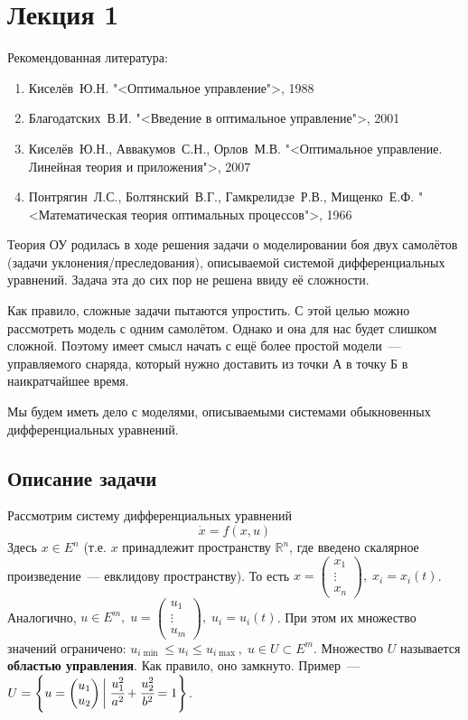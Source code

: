 \section{Лекция 1}

Рекомендованная литература:
\begin{enumerate}
    \item Киселёв~Ю.Н. "<Оптимальное управление">, 1988
    \item Благодатских~В.И. "<Введение в оптимальное управление">, 2001
    \item Киселёв~Ю.Н., Аввакумов~С.Н., Орлов~М.В. "<Оптимальное управление. Линейная теория и приложения">, 2007 %
    \item Понтрягин~Л.С., Болтянский~В.Г., Гамкрелидзе~Р.В., Мищенко~Е.Ф. "<Математическая теория оптимальных процессов">, 1966
\end{enumerate}

Теория ОУ родилась в ходе решения задачи о моделировании боя двух самолётов (задачи уклонения/преследования), описываемой системой дифференциальных уравнений.
Задача эта до сих пор не решена ввиду её сложности.

Как правило, сложные задачи пытаются упростить.
С этой целью можно рассмотреть модель с одним самолётом. 
Однако и она для нас будет слишком сложной.
Поэтому имеет смысл начать с ещё более простой модели~--- управляемого снаряда, который нужно доставить из точки А в точку Б в наикратчайшее время.

Мы будем иметь дело с моделями, описываемыми системами обыкновенных дифференциальных уравнений.

\subsection{Описание задачи}

Рассмотрим систему дифференциальных уравнений
\begin{equation}
    \dot{x} = f(x, u)
\end{equation}
Здесь $x \in E^n $ (т.е. $x$ принадлежит пространству $\mathbb{R}^n$, где введено скалярное произведение~--- евклидову пространству).
То есть $x = \left( \begin{matrix}
    x_1 \\
    \vdots \\
    x_n 
\end{matrix} \right), \; x_i = x_i(t)$.
Аналогично, $u \in E^m, \; u = \left( \begin{matrix}
    u_1 \\
    \vdots \\
    u_m 
\end{matrix} \right), \; u_i = u_i(t)$. 
При этом их множество значений ограничено: $u_{i \min} \leqslant u_i \leqslant u_{i \max}, \; u \in U \subset E^m$.
Множество $U$ называется \textbf{областью управления}. 
Как правило, оно замкнуто.
Пример~--- $U = \left\{u = \left(\begin{matrix}
    u_1 \\
    u_2
\end{matrix}\right)\biggl| \; \cfrac{u_1^2}{a^2} + \cfrac{u_2^2}{b^2} = 1\right\}$.


